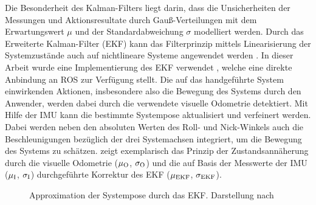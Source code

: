 Die Besonderheit des Kalman-Filters liegt darin, dass die Unsicherheiten der Messungen und Aktionsresultate durch Gauß-Verteilungen mit dem Erwartungswert $\mu$ und der Standardabweichung $\sigma$ modelliert werden. Durch das Erweiterte Kalman-Filter (EKF) kann das Filterprinzip mittels Linearisierung der Systemzustände auch auf nichtlineare Systeme angewendet werden \cite{Hertzberg2012}. In dieser Arbeit wurde eine Implementierung des EKF verwendet \cite{EKF}, welche eine direkte Anbindung an ROS zur Verfügung stellt. Die auf das handgeführte System einwirkenden Aktionen, insbesondere also die Bewegung des Systems durch den Anwender, werden dabei durch die verwendete visuelle Odometrie detektiert. Mit Hilfe der IMU kann die bestimmte Systempose aktualisiert und verfeinert werden. Dabei werden neben den absoluten Werten des Roll- und Nick-Winkels auch die Beschleunigungen bezüglich der drei Systemachsen integriert, um die Bewegung des Systems zu schätzen.  zeigt exemplarisch das Prinzip der Zustandsannäherung durch die visuelle Odometrie ($\mu_{{\mathrm{O}}}$, $\sigma_{{\mathrm{O}}}$) und die auf Basis der Messwerte der IMU ($\mu_{{\mathrm{I}}}$, $\sigma_{{\mathrm{I}}}$) durchgeführte Korrektur des EKF ($\mu_{{\mathrm{EKF}}}$, $\sigma_{{\mathrm{EKF}}}$).
\prever{
}%
\prever{
}
\begin{figure}[ht]
	\begin{center}%
		\hspace{5mm}
		\caption{Approximation der Systempose durch das EKF. Darstellung nach \cite{Hertzberg2012}}
		\label{fig.kalman}
	\end{center}
	\vspace*{-8mm}
\end{figure}

\prever{
}



